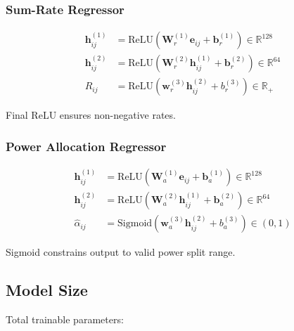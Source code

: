 \subsubsection{Sum-Rate Regressor}

\begin{equation}
\begin{aligned}
\mathbf{h}_{ij}^{(1)} &= \text{ReLU}(\mathbf{W}_r^{(1)} \mathbf{e}_{ij} + \mathbf{b}_r^{(1)}) \in \mathbb{R}^{128} \\
\mathbf{h}_{ij}^{(2)} &= \text{ReLU}(\mathbf{W}_r^{(2)} \mathbf{h}_{ij}^{(1)} + \mathbf{b}_r^{(2)}) \in \mathbb{R}^{64} \\
\hat{R}_{ij} &= \text{ReLU}(\mathbf{w}_r^{(3)} \mathbf{h}_{ij}^{(2)} + b_r^{(3)}) \in \mathbb{R}_+
\end{aligned}
\end{equation}

Final ReLU ensures non-negative rates.

\subsubsection{Power Allocation Regressor}

\begin{equation}
\begin{aligned}
\mathbf{h}_{ij}^{(1)} &= \text{ReLU}(\mathbf{W}_a^{(1)} \mathbf{e}_{ij} + \mathbf{b}_a^{(1)}) \in \mathbb{R}^{128} \\
\mathbf{h}_{ij}^{(2)} &= \text{ReLU}(\mathbf{W}_a^{(2)} \mathbf{h}_{ij}^{(1)} + \mathbf{b}_a^{(2)}) \in \mathbb{R}^{64} \\
\hat{\alpha}_{ij} &= \text{Sigmoid}(\mathbf{w}_a^{(3)} \mathbf{h}_{ij}^{(2)} + b_a^{(3)}) \in (0,1)
\end{aligned}
\end{equation}

Sigmoid constrains output to valid power split range.

\subsection{Model Size}

Total trainable parameters:

